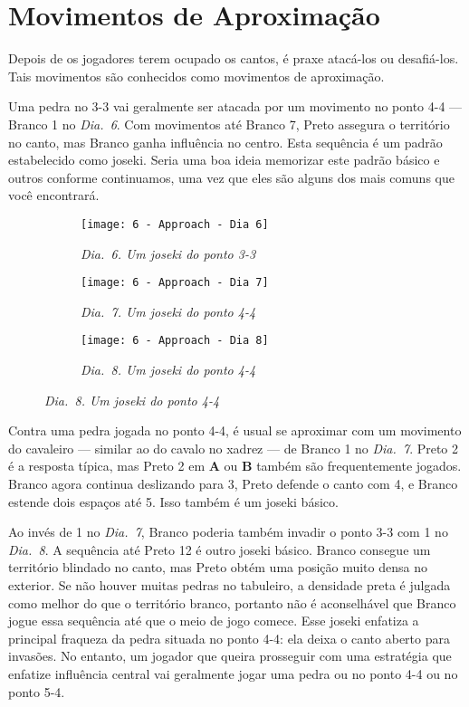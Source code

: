 \pagebreak

\section{Movimentos de Aproximação}

Depois de os jogadores terem ocupado os cantos, é praxe atacá-los ou desafiá-los. Tais movimentos são conhecidos como movimentos de aproximação.

Uma pedra no 3-3 vai geralmente ser atacada por um movimento no ponto 4-4 --- Branco 1 no \emph{Dia.\@~6}. Com movimentos até Branco 7, Preto assegura o território no canto, mas Branco ganha influência no centro. Esta sequência é um padrão estabelecido como joseki. Seria uma boa ideia memorizar este padrão básico e outros conforme continuamos, uma vez que eles são alguns dos mais comuns que você encontrará.


\begin{figure}[h!]
    \centering
    \begin{subfigure}[t]{.3\textwidth}
        \centering
        \texttt{[image: 6 - Approach - Dia 6]}
        \captionsetup{justification=centering}
        \caption*{\emph{Dia.\@~6. Um joseki do ponto 3-\@3}}
    \end{subfigure}
    \hfill
    \begin{subfigure}[t]{.3\textwidth}
        \centering
        \texttt{[image: 6 - Approach - Dia 7]}
        \captionsetup{justification=centering}
        \caption*{\emph{Dia.\@~7. Um joseki do ponto 4-\@4}}
    \end{subfigure}
    \hfill
    \begin{subfigure}[t]{.3\textwidth}
        \centering
        \texttt{[image: 6 - Approach - Dia 8]}
        \captionsetup{justification=centering}
        \caption*{\emph{Dia.\@~8. Um joseki do ponto 4-\@4}}
    \end{subfigure}
\end{figure}

Contra uma pedra jogada no ponto 4-4, é usual se aproximar com um movimento do cavaleiro --- similar ao do cavalo no xadrez --- de Branco 1 no \emph{Dia.\@~7}. Preto 2 é a resposta típica, mas Preto 2 em \textbf{A} ou \textbf{B} também são frequentemente jogados. Branco agora continua deslizando para 3, Preto defende o canto com 4, e Branco estende dois espaços até 5. Isso também é um joseki básico.

Ao invés de 1 no \emph{Dia.\@~7}, Branco poderia também invadir o ponto 3-3 com 1 no \emph{Dia.\@~8}. A sequência até Preto 12 é outro joseki básico. Branco consegue um território blindado no canto, mas Preto obtém uma posição muito densa no exterior. Se não houver muitas pedras no tabuleiro, a densidade preta é julgada como melhor do que o território branco, portanto não é aconselhável que Branco jogue essa sequência até que o meio de jogo comece. Esse joseki enfatiza a principal fraqueza da pedra situada no ponto 4-4: ela deixa o canto aberto para invasões. No entanto, um jogador que queira prosseguir com uma estratégia que enfatize influência central vai geralmente jogar uma pedra ou no ponto 4-4 ou no ponto 5-4.

